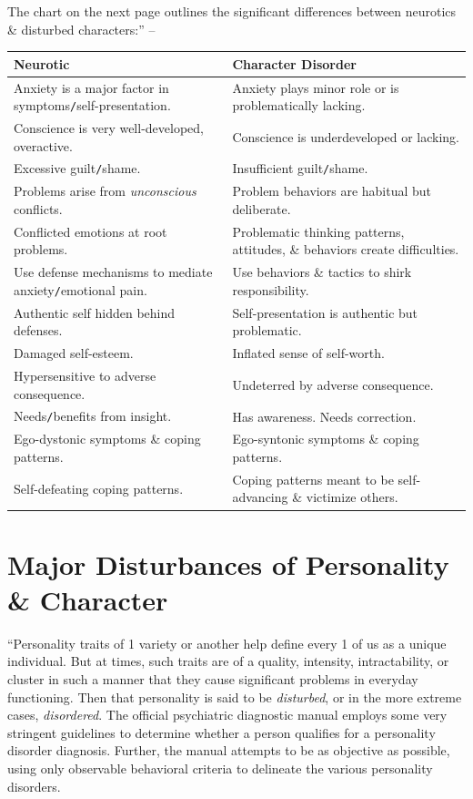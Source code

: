 \documentclass{article}
\numberwithin{equation}{section}
\begin{document}
The chart on the next page outlines the significant differences between neurotics \& disturbed characters:'' -- \cite[p. 27--53]{Simon2011}
\begin{table}[H]
	\centering
	\begin{tabular}{|p{}|p{}|}
		\hline
		\textbf{Neurotic} & \textbf{Character Disorder} \\
		\hline
		Anxiety is a major factor in symptoms\texttt{/}self-presentation. & Anxiety plays minor role or is problematically lacking. \\
		\hline
		Conscience is very well-developed, overactive. & Conscience is underdeveloped or lacking. \\
		\hline
		Excessive guilt\texttt{/}shame. & Insufficient guilt\texttt{/}shame. \\
		\hline
		Problems arise from \textit{unconscious} conflicts. & Problem behaviors are habitual but deliberate. \\
		\hline
		Conflicted emotions at root problems. & Problematic thinking patterns, attitudes, \& behaviors create difficulties. \\
		\hline
		Use defense mechanisms to mediate anxiety\texttt{/}emotional pain. & Use behaviors \& tactics to shirk responsibility. \\
		\hline
		Authentic self hidden behind defenses. & Self-presentation is authentic but problematic. \\
		\hline
		Damaged self-esteem. & Inflated sense of self-worth. \\
		\hline
		Hypersensitive to adverse consequence. & Undeterred by adverse consequence. \\
		\hline
		Needs\texttt{/}benefits from insight. & Has awareness. Needs correction. \\
		\hline
		Ego-dystonic symptoms \& coping patterns. & Ego-syntonic symptoms \& coping patterns. \\
		\hline
		Self-defeating coping patterns. & Coping patterns meant to be self-advancing \& victimize others. \\
		\hline
	\end{tabular}
\end{table}


\section{Major Disturbances of Personality \& Character}
``Personality traits of 1 variety or another help define every 1 of us as a unique individual. But at times, such traits are of a quality, intensity, intractability, or cluster in such a manner that they cause significant problems in everyday functioning. Then that personality is said to be \textit{disturbed}, or in the more extreme cases, \textit{disordered}. The official psychiatric diagnostic manual employs some very stringent guidelines to determine whether a person qualifies for a personality disorder diagnosis. Further, the manual attempts to be as objective as possible, using only observable behavioral criteria to delineate the various personality disorders.
\end{document}
